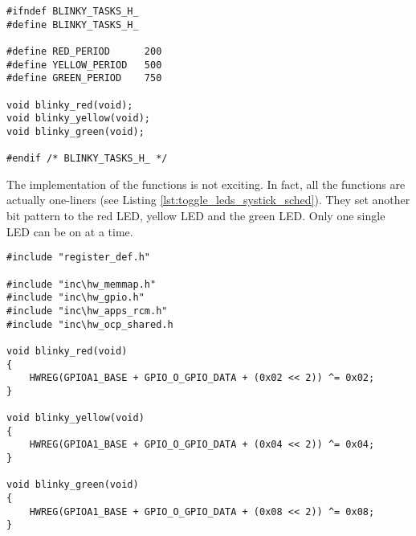 \begin{lstlisting}[style=CStyle, caption={\texttt{blinky\_tasks.h} prototyping the functions tasks should be called and their period}, captionpos=b, label={lst:blinkytask_h}, escapechar=@]
#ifndef BLINKY_TASKS_H_
#define BLINKY_TASKS_H_

#define RED_PERIOD      200
#define YELLOW_PERIOD   500
#define GREEN_PERIOD    750

void blinky_red(void);
void blinky_yellow(void);
void blinky_green(void);

#endif /* BLINKY_TASKS_H_ */

\end{lstlisting}

The implementation of the functions is not exciting.
In fact, all the functions are actually one-liners (see Listing \ref{lst:toggle_leds_systick_sched}).
They set another bit pattern to the red LED, yellow LED and the green LED.
Only one single LED can be on at a time.



\begin{lstlisting}[style=CStyle, caption={Toggling LED tasks according to Table \ref{tab:led_schedule} }, captionpos=b, label={lst:toggle_leds_systick_sched}, escapechar=@]
#include "register_def.h"

#include "inc\hw_memmap.h"
#include "inc\hw_gpio.h"
#include "inc\hw_apps_rcm.h"
#include "inc\hw_ocp_shared.h

void blinky_red(void)
{
    HWREG(GPIOA1_BASE + GPIO_O_GPIO_DATA + (0x02 << 2)) ^= 0x02;
}

void blinky_yellow(void)
{
    HWREG(GPIOA1_BASE + GPIO_O_GPIO_DATA + (0x04 << 2)) ^= 0x04;
}

void blinky_green(void)
{
    HWREG(GPIOA1_BASE + GPIO_O_GPIO_DATA + (0x08 << 2)) ^= 0x08;
}
\end{lstlisting}


